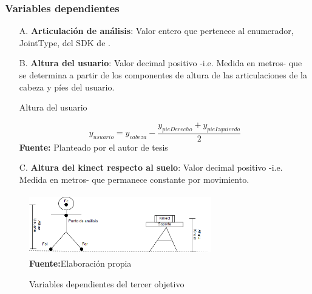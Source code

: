 \subsubsection{Variables dependientes} \label{vr:3o:dep}
\begin{enumerate}
	\item[A.] \textbf{Articulaci\'on de an\'alisis}: Valor entero que pertenece al  enumerador, JointType, del SDK de . 
	\item[B.] \textbf{Altura del usuario}: Valor decimal positivo -i.e. Medida en metros- que se determina a partir de los componentes de altura de las articulaciones de la cabeza y p\'ies del usuario.	
	\begin{formula}[h]
	\centering
	\caption{Altura del usuario}
	\label{frm:alturaUser}
	\begin{equation}
y_{usuario}=y_{cabeza}-\frac{y_{pieDerecho}+y_{pieIzquierdo}}{2}
	\end{equation}
			\textbf{Fuente:} Planteado por el autor de tesis
\end{formula}  
	\item[C.] \textbf{Altura del kinect respecto al suelo}: Valor decimal positivo -i.e. Medida en metros- que permanece constante por movimiento. 
\end{enumerate}
\medbreak
\begin{figure}[H]
	\caption{Variables dependientes del tercer objetivo}
	\label{fig:vardep3}
	\centering
	\includegraphics[width=300px,height=100px]{graphics/var-3obj.png} \\
	\textbf{Fuente:}Elaboraci\'on propia 
\end{figure}
\medbreak
